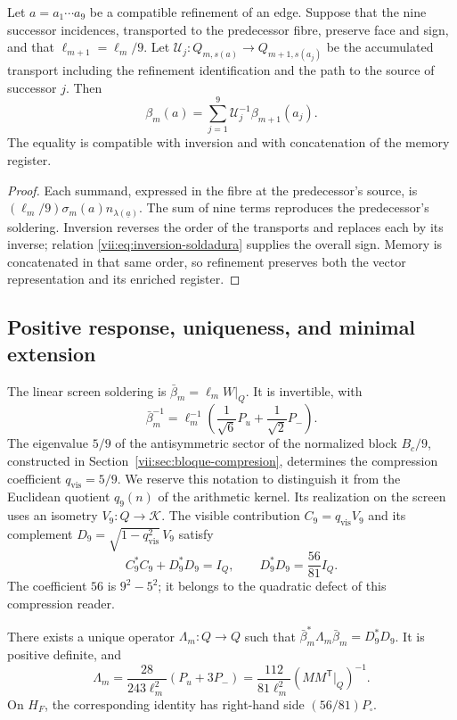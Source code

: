 \begin{proposition}
\label{vii:prop:refinamiento-soldadura}
Let \(a=a_1\cdots a_9\) be a compatible refinement of an edge.
Suppose that the nine successor incidences, transported to the predecessor
fibre, preserve face and sign, and that
\(\ell_{m+1}=\ell_m/9\). Let
\(\mathcal U_j:Q_{m,s(a)}\longrightarrow Q_{m+1,s(a_j)}\)
be the accumulated transport including the refinement identification
and the path to the source of successor \(j\). Then
\[
 \beta_m(a)=
 \sum_{j=1}^{9}\mathcal U_j^{-1}\beta_{m+1}(a_j).
\]
The equality is compatible with inversion and with concatenation
of the memory register.
\end{proposition}

\begin{proof}
Each summand, expressed in the fibre at the predecessor's source, is
\((\ell_m/9)\sigma_m(a)n_{\lambda(\underline a)}\).
The sum of nine terms reproduces the predecessor's soldering.
Inversion reverses the order of the transports and replaces each
by its inverse; relation \eqref{vii:eq:inversion-soldadura} supplies
the overall sign. Memory is concatenated in that same order, so
refinement preserves both the vector representation and its
enriched register.
\end{proof}

\subsection{Positive response, uniqueness, and minimal extension}
\label{vii:sec:respuesta-positiva}

The linear screen soldering is
\(\bar\beta_m=\ell_mW|_Q\). It is invertible, with
\[
 \bar\beta_m^{-1}
 =\ell_m^{-1}\left(\frac1{\sqrt6}P_u+\frac1{\sqrt2}P_-\right).
\]
The eigenvalue \(5/9\) of the antisymmetric sector of the normalized block
\(B_c/9\), constructed in Section~\ref{vii:sec:bloque-compresion},
determines the compression
coefficient \(q_{\mathrm{vis}}=5/9\). We reserve this notation to
distinguish it from the Euclidean quotient \(q_9(n)\) of the arithmetic kernel.
Its realization on the screen uses an isometry
\(V_9:Q\longrightarrow\mathcal K\). The visible contribution
\(C_9=q_{\mathrm{vis}}V_9\) and its complement
\(D_9=\sqrt{1-q_{\mathrm{vis}}^2}\,V_9\) satisfy
\[
 C_9^*C_9+D_9^*D_9=I_Q,\qquad D_9^*D_9=\frac{56}{81}I_Q.
\]
The coefficient \(56\) is \(9^2-5^2\); it belongs to the quadratic defect
of this compression reader.

\begin{theorem}
\label{vii:thm:respuesta-unica}
There exists a unique operator \(\Lambda_m:Q\longrightarrow Q\) such that
\(\bar\beta_m^*\Lambda_m\bar\beta_m=D_9^*D_9\). It is positive definite, and
\begin{equation}
 \Lambda_m=\frac{28}{243\ell_m^2}(P_u+3P_-)
 =\frac{112}{81\ell_m^2}
       (MM^{\mathsf T}|_Q)^{-1}.
 \label{vii:eq:lambda-pantalla}
\end{equation}
On \(H_F\), the corresponding identity has right-hand side
\((56/81)P_\square\).
\end{theorem}


